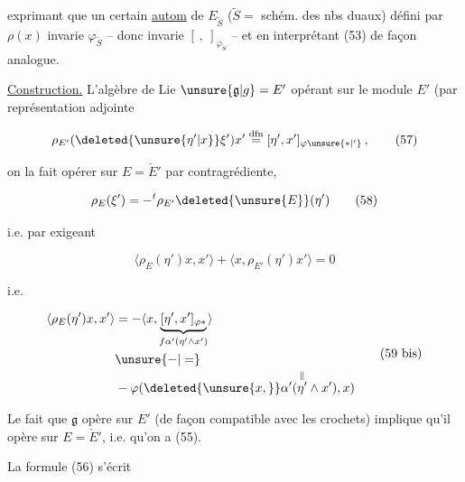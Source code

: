 exprimant que un certain \uline{autom} de $E_{\widetilde S}$ ($\widetilde S={}$ schém. des nbs duaux) défini par $\rho(x)$ invarie $\varphi_{\widetilde S}$ -- donc invarie $[\ ,\ ]_{\varphi_{\widetilde S}}$ -- et en interprétant (53) de façon analogue.

\uline{Construction.} L'algèbre de Lie  $\unsure{\mathfrak g|g}=E'$ opérant sur le module $E'$ (par représentation adjointe

\[
\rho_{E'}(\deleted{\unsure{\eta'|x}}\xi')x'\overset{\mathrm{dfn}}{=}[\eta',x']_{\varphi\unsure{*|'}}\,, \tag*{(57)}
\]

on la fait opérer sur $E=\check E'$ par contragrédiente,

\[
\rho_E(\xi')=-{}^t\rho_{E'}\deleted{\unsure{E}}(\eta') \tag*{(58)}
\]

i.e. par exigeant

\[
\langle\rho_E(\eta')x,x'\rangle+\langle x,\rho_{E'}(\eta')x'\rangle=0 \tag*{(59)}
\]

i.e.

\[
\begin{aligned}
\langle\rho_E(\eta')x,x'\rangle
&=-\langle x,\underbrace{[\eta',x']_{\varphi *}}_{f\alpha'(\eta'\wedge x')}\rangle\\
&\unsure{-|=}\\[-.5ex]
&-\varphi(\deleted{\unsure{x,}}\alpha'(\overset{\Vert}{\eta'}\wedge x'),x)
\end{aligned}
\tag*{(59 bis)}
\]

Le fait que $\mathfrak g$ opère sur $E'$ (de façon compatible avec les crochets) implique qu'il opère sur $E=\check E'$, i.e. qu'on a (55).

La formule (56) s'écrit 

